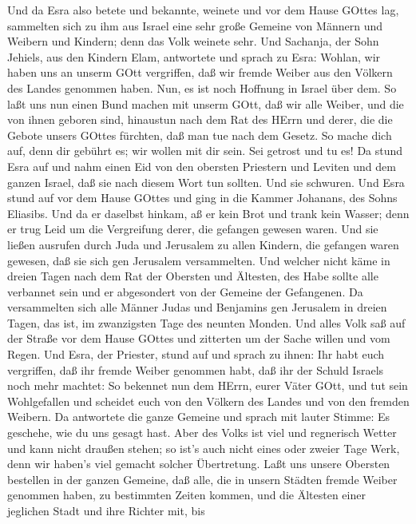  Und da Esra also betete und bekannte, weinete und vor dem
Hause GOttes lag, sammelten sich zu ihm aus Israel eine sehr große
Gemeine von Männern und Weibern und Kindern; denn das Volk weinete sehr.
 Und Sachanja, der Sohn Jehiels, aus den Kindern Elam,
antwortete und sprach zu Esra: Wohlan, wir haben uns an unserm GOtt
vergriffen, daß wir fremde Weiber aus den Völkern des Landes genommen
haben. Nun, es ist noch Hoffnung in Israel über dem.  So
laßt uns nun einen Bund machen mit unserm GOtt, daß wir alle Weiber, und
die von ihnen geboren sind, hinaustun nach dem Rat des HErrn und derer,
die die Gebote unsers GOttes fürchten, daß man tue nach dem Gesetz.
 So mache dich auf, denn dir gebührt es; wir wollen mit dir
sein. Sei getrost und tu es!  Da stund Esra auf und nahm
einen Eid von den obersten Priestern und Leviten und dem ganzen Israel,
daß sie nach diesem Wort tun sollten. Und sie schwuren.  Und
Esra stund auf vor dem Hause GOttes und ging in die Kammer Johanans, des
Sohns Eliasibs. Und da er daselbst hinkam, aß er kein Brot und trank
kein Wasser; denn er trug Leid um die Vergreifung derer, die gefangen
gewesen waren.  Und sie ließen ausrufen durch Juda und
Jerusalem zu allen Kindern, die gefangen waren gewesen, daß sie sich gen
Jerusalem versammelten.  Und welcher nicht käme in dreien
Tagen nach dem Rat der Obersten und Ältesten, des Habe sollte alle
verbannet sein und er abgesondert von der Gemeine der Gefangenen.
 Da versammelten sich alle Männer Judas und Benjamins gen
Jerusalem in dreien Tagen, das ist, im zwanzigsten Tage des neunten
Monden. Und alles Volk saß auf der Straße vor dem Hause GOttes und
zitterten um der Sache willen und vom Regen.  Und Esra, der
Priester, stund auf und sprach zu ihnen: Ihr habt euch vergriffen, daß
ihr fremde Weiber genommen habt, daß ihr der Schuld Israels noch mehr
machtet:  So bekennet nun dem HErrn, eurer Väter GOtt, und
tut sein Wohlgefallen und scheidet euch von den Völkern des Landes und
von den fremden Weibern.  Da antwortete die ganze Gemeine
und sprach mit lauter Stimme: Es geschehe, wie du uns gesagt hast.
 Aber des Volks ist viel und regnerisch Wetter und kann
nicht draußen stehen; so ist's auch nicht eines oder zweier Tage Werk,
denn wir haben's viel gemacht solcher Übertretung.  Laßt
uns unsere Obersten bestellen in der ganzen Gemeine, daß alle, die in
unsern Städten fremde Weiber genommen haben, zu bestimmten Zeiten
kommen, und die Ältesten einer jeglichen Stadt und ihre Richter mit, bis
